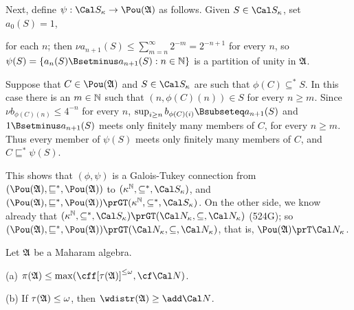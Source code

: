 {\noindent Next, define $\psi:\Cal S_{\kappa}\to\Pou(\frak A)$ as follows.
Given $S\in\Cal S_{\kappa}$, set $a_0(S)=1$,


\noindent for each $n$;  then
$\nu a_{n+1}(S)\le\sum_{m=n}^{\infty}2^{-m}=2^{-n+1}$ for every $n$, so
$\psi(S)=\{a_n(S)\Bsetminus a_{n+1}(S):n\in\Bbb N\}$
is a partition of unity in $\frak A$.

\medskip

 Suppose that $C\in\Pou(\frak A)$ and $S\in\Cal S_{\kappa}$ are such
that $\phi(C)\subseteq^*S$.   In this case there is an $m\in\Bbb N$ such
that $(n,\phi(C)(n))\in S$ for every $n\ge m$.   Since
$\nu b_{\phi(C)(n)}\le 4^{-n}$ for every $n$,
$\sup_{i\ge n}b_{\phi(C)(i)}\Bsubseteq a_{n+1}(S)$
and $1\Bsetminus a_{n+1}(S)$ meets only finitely many members of
$C$, for every $n\ge m$.   Thus every member of $\psi(S)$ meets only
finitely many members of $C$, and $C\sqsubseteq^*\psi(S)$.

This shows that $(\phi,\psi)$ is a Galois-Tukey connection from
$(\Pou(\frak A),\sqsubseteq^*,\Pou(\frak A))$ to
$(\kappa^{\Bbb N},\subseteq^*,\Cal S_{\kappa})$, and
$(\Pou(\frak A),\sqsubseteq^*,\Pou(\frak A))
\prGT(\kappa^{\Bbb N},\subseteq^*,\Cal S_{\kappa})$.
On the other side, we know already that
$(\kappa^{\Bbb N},\subseteq^*,\Cal S_{\kappa})
\prGT(\Cal N_{\kappa},\subseteq,\penalty-50\Cal N_{\kappa})$ (524G);  so
$(\Pou(\frak A),\sqsubseteq^*,\Pou(\frak A))
\prGT(\Cal N_{\kappa},\penalty-100\subseteq\penalty+100,\Cal N_{\kappa})$,
that is, $\Pou(\frak A)\prT\Cal N_{\kappa}$.
}%

 Let $\frak A$ be a Maharam algebra.

(a) $\pi(\frak A)\le\max(\cff[\tau(\frak A)]^{\le\omega},\cf\Cal N)$.

(b) If $\tau(\frak A)\le\omega$, then $\wdistr(\frak A)\ge\add\Cal N$.

